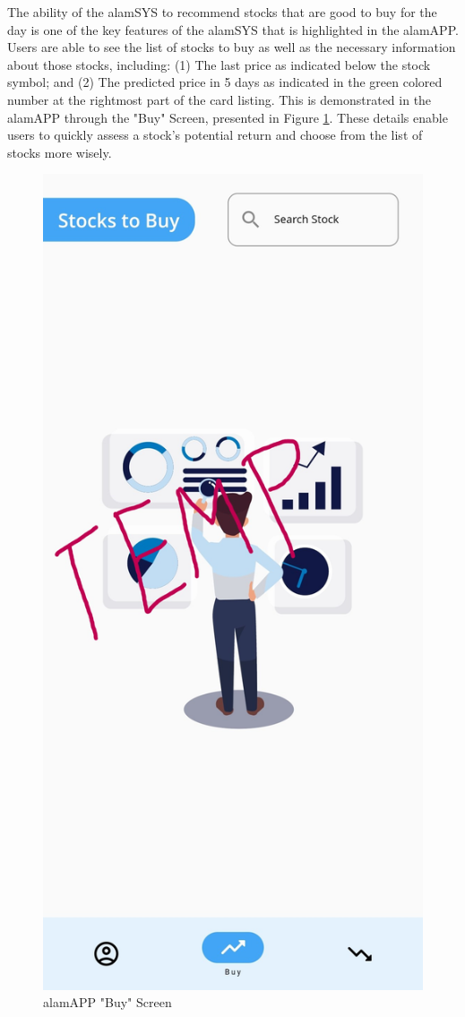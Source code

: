 The ability of the alamSYS to recommend stocks that are good to buy for the 
day is one of the key features of the alamSYS that is highlighted in the alamAPP. 
Users are able to see the list of stocks to buy as well as the necessary information 
about those stocks, including: (1) The last price as indicated below the stock symbol; 
and (2) The predicted price in 5 days as indicated in the green colored number at 
the rightmost part of the card listing. This is demonstrated in the alamAPP through 
the "Buy" Screen, presented in Figure \ref{fig:alamAPP_buy}. 
These details enable users to quickly assess a stock's potential return and choose 
from the list of stocks more wisely.
\begin{figure}[ht]
  \centering
  \includegraphics[height=0.40\textheight]{./assets/Chapter_4/mobile_ui/temp.jpg}
  \caption{alamAPP "Buy" Screen}
  \label{fig:alamAPP_buy}
\end{figure}
